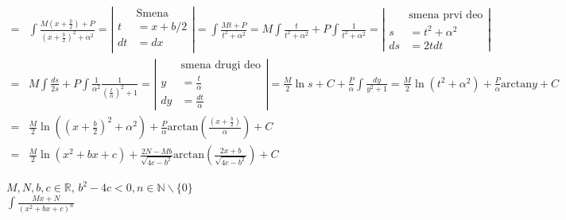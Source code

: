 \documentclass{article}
\begin{document}
\begin{align*}
    = & \int \frac{M(x + \frac{b}{2}) + P}{(x + \frac{b}{2})^2 + \alpha^2} =
    \left | \begin{alignedat}{3}
                   & \text{Smena} \\
                t  & = x + b/2    \\
                dt & = dx         \\
            \end{alignedat} \right |
    = \int \frac{Mt + P}{t^2 + \alpha ^2}
    = M\int\frac{t}{t^2 + \alpha ^2}+P\int\frac{1}{t^2 + \alpha^2}
    = \left | \begin{alignedat}{3}
                     & \text{smena prvi deo} \\
                  s  & = t^2 + \alpha^2      \\
                  ds & = 2t dt
              \end{alignedat} \right |                                                                                       \\
    = & M\int\frac{ds}{2s} + P\int\frac{1}{\alpha^2}\frac{1}{(\frac{t}{\alpha})^2 + 1}
    = \left | \begin{alignedat}{3}
                     & \text{smena drugi deo} \\
                  y  & = \frac{t}{\alpha}     \\
                  dy & = \frac{dt}{\alpha}
              \end{alignedat}\right |
    = \frac{M}{2}\ln{s} + C + \frac{P}{\alpha}\int\frac{dy}{y^2 + 1}
    = \frac{M}{2}\ln{(t^2 + \alpha^2)} + \frac{P}{\alpha}\text{arctan}y + C                                                    \\
    = & \frac{M}{2}\ln{((x + \frac{b}{2})^2 + \alpha^2)} + \frac{P}{\alpha}\text{arctan}(\frac{(x + \frac{b}{2})}{\alpha}) + C \\
    = & \frac{M}{2}\ln{(x^2 + bx + c)} + \frac{2N-Mb}{\sqrt{4c - b^2}}\text{arctan}(\frac{2x+b}{\sqrt{4c-b^2}}) + C
\end{align*}
\begin{primbox}
    $M, N, b, c \in \mathbb{R}$,
    $b^2 - 4c < 0, n \in \mathbb{N}\backslash\{0\}$\\
    $\int \frac{Mx + N}{(x^2 + bx + c)^n}$
\end{primbox}
\end{document}
